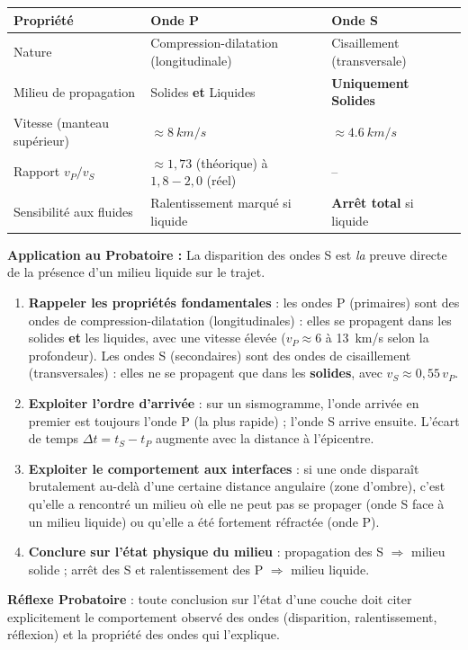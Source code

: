 \documentclass[11pt]{article}
\newcommand{\cle}[1]{{\popxbold\color{popdark}#1}}
\begin{document}
\begin{propriete}
\begin{center}
\begin{tabularx}{\linewidth}{|l|X|X|}\hline
\textbf{Propriété} & \textbf{Onde P} & \textbf{Onde S} \\ \hline
Nature & Compression-dilatation (longitudinale) & Cisaillement (transversale) \\
Milieu de propagation & Solides \textbf{et} Liquides & \textbf{Uniquement Solides} \\
Vitesse (manteau supérieur) & $\approx \SI{8}{km/s}$ & $\approx \SI{4,6}{km/s}$ \\
Rapport $v_P/v_S$ & $\approx 1{,}73$ (théorique) à $1{,}8-2{,}0$ (réel) & -- \\
Sensibilité aux fluides & Ralentissement marqué si liquide & \textbf{Arrêt total} si liquide \\ \hline
\end{tabularx}
\end{center}
\textbf{Application au Probatoire :} La disparition des ondes S est \emph{la} preuve directe de la présence d'un milieu liquide sur le trajet.
\end{propriete}

\begin{methode}
\begin{enumerate}
\item \textbf{Rappeler les propriétés fondamentales} : les ondes \cle{P} (primaires) sont des ondes de \cle{compression-dilatation} (longitudinales) : elles se propagent dans les solides \textbf{et} les liquides, avec une vitesse élevée ($v_P \approx 6$ à \SI{13}{km/s} selon la profondeur). Les ondes \cle{S} (secondaires) sont des ondes de \cle{cisaillement} (transversales) : elles ne se propagent que dans les \textbf{solides}, avec $v_S \approx 0{,}55\,v_P$.
\item \textbf{Exploiter l'ordre d'arrivée} : sur un sismogramme, l'onde arrivée en premier est toujours l'onde P (la plus rapide) ; l'onde S arrive ensuite. L'écart de temps $\Delta t = t_S - t_P$ augmente avec la distance à l'épicentre.
\item \textbf{Exploiter le comportement aux interfaces} : si une onde disparaît brutalement au-delà d'une certaine distance angulaire (zone d'ombre), c'est qu'elle a rencontré un milieu où elle ne peut pas se propager (onde S face à un milieu liquide) ou qu'elle a été fortement réfractée (onde P).
\item \textbf{Conclure sur l'état physique du milieu} : propagation des S $\Rightarrow$ milieu solide ; arrêt des S et ralentissement des P $\Rightarrow$ milieu liquide.
\end{enumerate}
\textbf{Réflexe Probatoire} : toute conclusion sur l'état d'une couche doit citer explicitement le comportement observé des ondes (disparition, ralentissement, réflexion) et la propriété des ondes qui l'explique.
\end{methode}
\end{document}
